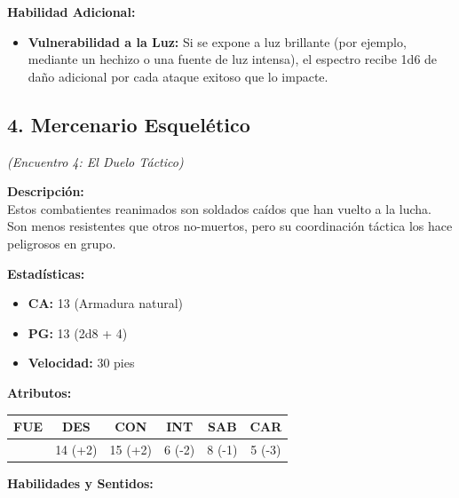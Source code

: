 \documentclass[
  twocolumn]{article}
\providecommand{\tightlist}{%
  \setlength{\itemsep}{0pt}\setlength{\parskip}{0pt}}
\begin{document}
\textbf{Habilidad Adicional:}

\begin{itemize}
\tightlist
\item
  \textbf{Vulnerabilidad a la Luz:} Si se expone a luz brillante (por
  ejemplo, mediante un hechizo o una fuente de luz intensa), el espectro
  recibe 1d6 de daño adicional por cada ataque exitoso que lo impacte.
\end{itemize}

\subsection{4. Mercenario Esquelético}\label{mercenario-esqueluxe9tico}

\emph{(Encuentro 4: El Duelo Táctico)}

\textbf{Descripción:}\\
Estos combatientes reanimados son soldados caídos que han vuelto a la
lucha. Son menos resistentes que otros no-muertos, pero su coordinación
táctica los hace peligrosos en grupo.

\textbf{Estadísticas:}

\begin{itemize}
\tightlist
\item
  \textbf{CA:} 13 (Armadura natural)
\item
  \textbf{PG:} 13 (2d8 + 4)
\item
  \textbf{Velocidad:} 30 pies
\end{itemize}

\textbf{Atributos:}

\begin{longtable}[]{@{}cccccc@{}}
\toprule\noalign{}
FUE & DES & CON & INT & SAB & CAR \\
\midrule\noalign{}
\endhead
\bottomrule\noalign{}
\endlastfoot
10 & 14 (+2) & 15 (+2) & 6 (-2) & 8 (-1) & 5 (-3) \\
\end{longtable}

\textbf{Habilidades y Sentidos:}
\end{document}
